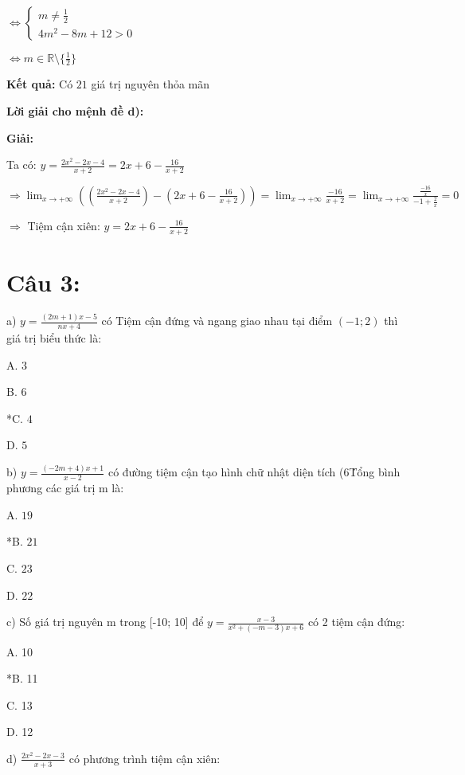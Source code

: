 \documentclass{article}
\begin{document}
\(\Leftrightarrow \begin{cases}
m \neq \frac{1}{2} \\
4m^2 - 8m + 12 > 0
\end{cases}\)

\(\Leftrightarrow m \in \mathbb{R} \setminus \{\frac{1}{2}\}\)

\textbf{Kết quả:} Có \(21\) giá trị nguyên thỏa mãn

\textbf{Lời giải cho mệnh đề d):}

\textbf{Giải:}

Ta có: \(y = \frac{2x^2 - 2x - 4}{x + 2} = 2x + 6 - \frac{16}{x + 2}\)

\(\Rightarrow \displaystyle\lim_{x \to +\infty} \left(\left(\frac{2x^2 - 2x - 4}{x + 2}\right) - \left(2x + 6 - \frac{16}{x + 2}\right)\right) = \displaystyle\lim_{x \to +\infty} \frac{-16}{x + 2} = \displaystyle\lim_{x \to +\infty} \frac{\frac{-16}{x}}{-1 + \frac{2}{x}} = 0\)

\(\Rightarrow\) Tiệm cận xiên: \(y = 2x + 6 - \frac{16}{x + 2}\)



\newpage

\section*{Câu 3:}

a) \(y = \frac{(2m + 1)x - 5}{nx + 4}\) có Tiệm cận đứng và ngang giao nhau tại điểm \((-1; 2)\) thì giá trị biểu thức là:

A. \(3\)

B. \(6\)

*C. \(4\)

D. \(5\)


b) \(y = \frac{(-2m + 4)x + 1}{x - 2}\) có đường tiệm cận tạo hình chữ nhật diện tích (6\. Tổng bình phương các giá trị m là:

A. \(19\)

*B. \(21\)

C. \(23\)

D. \(22\)


c) Số giá trị nguyên m trong [-10; 10] để \(y = \frac{x - 3}{x^2 + (-m - 3)x + 6}\) có 2 tiệm cận đứng:

A. 10

*B. 11

C. 13

D. 12


d) \(\frac{2x^2 - 2x - 3}{x + 3}\) có phương trình tiệm cận xiên:
\end{document}
